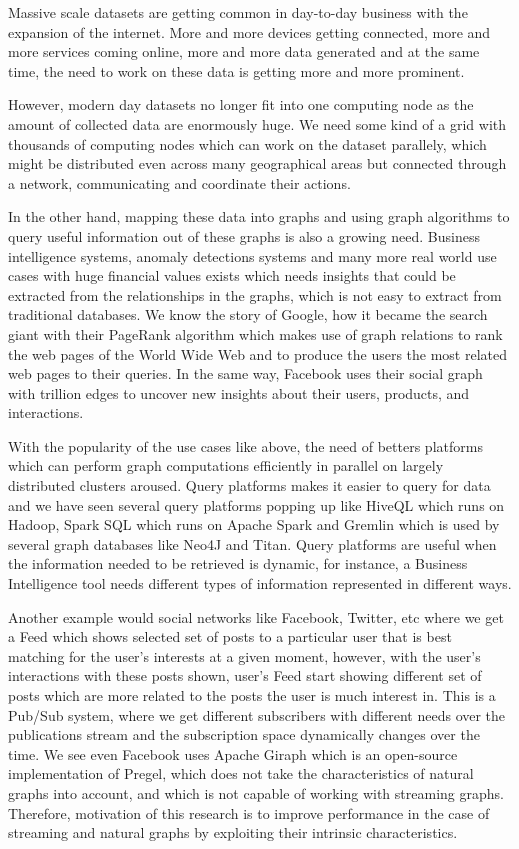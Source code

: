 \documentclass[12pt]{article}
\begin{document}
Massive scale datasets are getting common in day-to-day business with the expansion of the internet. More and more devices getting connected, more and more services coming online, more and more data generated and at the same time, the need to work on these data is getting more and more prominent.

However, modern day datasets no longer fit into one computing node as the amount of collected data are enormously huge.  We need some kind of a grid with thousands of computing nodes which can work on the dataset parallely, which might be distributed even across many geographical areas but connected through a network, communicating and coordinate their actions.

In the other hand, mapping these data into graphs and using graph algorithms to query useful information out of these graphs is also a growing need. Business intelligence systems, anomaly detections systems and many more real world use cases with huge financial values exists which needs insights that could be extracted from the relationships in the graphs, which is not easy to extract from traditional databases. We know the story of Google, how it became the search giant with their PageRank\cite{PageRank} algorithm which makes use of graph relations to rank the web pages of the World Wide Web and to produce the users the most related web pages to their queries. In the same way, Facebook uses their social graph with trillion edges\cite{Facebook} to uncover new insights about their users, products, and interactions.


With the popularity of the use cases like above, the need of betters platforms which can perform graph computations efficiently in parallel on largely distributed clusters aroused. Query platforms makes it easier to query for data and we have seen several query platforms popping up like HiveQL which runs on Hadoop, Spark SQL which runs on Apache Spark and Gremlin which is used by several graph databases like Neo4J and Titan. Query platforms are useful when the information needed to be retrieved is dynamic, for instance, a Business Intelligence tool needs different types of information represented in different ways.

Another example would social networks like Facebook, Twitter, etc where we get a Feed which shows selected set of posts to a particular user that is best matching for the user’s interests at a given moment, however, with the user’s interactions with these posts shown, user’s Feed start showing different set of posts which are more related to the posts the user is much interest in. This is a Pub/Sub system, where we get different subscribers with different needs over the publications stream and the subscription space dynamically changes over the time. We see even Facebook uses\cite{Facebook} Apache Giraph which is an open-source implementation of Pregel\cite{Pregel}, which does not take the characteristics of natural graphs into account, and which is not capable of working with streaming graphs. Therefore, motivation of this research is to improve performance in the case of streaming and natural graphs by exploiting their intrinsic characteristics.
\end{document}
